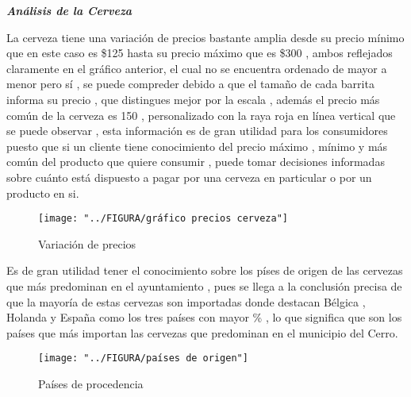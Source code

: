 \documentclass[10pt]{beamer}
\begin{document}
   	
   	\begin{frame}{\textbf{\textit{Análisis de la Cerveza}}}
   		
   	   La cerveza tiene una variación de precios bastante amplia desde su precio mínimo que en este caso es \$125 hasta su precio máximo que es \$300 , ambos reflejados claramente en el gráfico anterior, el cual no se encuentra ordenado de mayor a menor pero sí , se puede compreder debido a que el tamaño de cada barrita informa su precio , que distingues mejor por la escala , además el precio más común de la cerveza es 150 , personalizado con la raya roja en línea vertical que se puede observar , esta información es de gran utilidad para los consumidores puesto que si un cliente tiene conocimiento del precio máximo , mínimo y más común del producto que quiere consumir , puede tomar decisiones informadas sobre cuánto está dispuesto a pagar por una cerveza en particular o por un producto en si.
   	   
   	\end{frame}
   	
   	\begin{frame}
   		
   	 \begin{figure}
   		\centering
   		\texttt{[image: "../FIGURA/gráfico precios cerveza"]}
   		\caption{Variación de precios}
   		\label{fig:grafico-precios-cerveza}
   	 \end{figure}
    \end{frame}
    
    
    \begin{frame}
    	
     Es de gran utilidad tener el conocimiento sobre los píses de origen de las cervezas que más predominan en el ayuntamiento , pues se llega a la conclusión precisa de que la mayoría de estas cervezas son importadas donde destacan Bélgica , Holanda y España como los tres países con mayor \% , lo que significa que son los países que más importan las cervezas que predominan en el municipio del Cerro.
    	
    \end{frame}
   	
   	\begin{figure}
   		\centering
   		\texttt{[image: "../FIGURA/países de origen"]}
   		\caption{Países de procedencia}
   		\label{fig:paises-de-origen}
   	\end{figure}
   	
\end{document}
